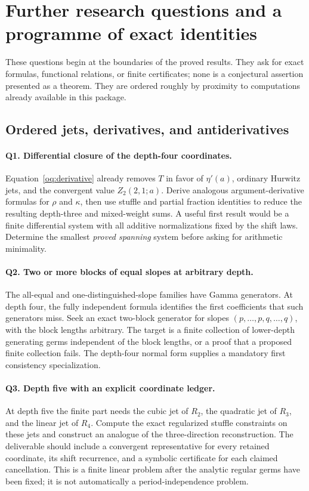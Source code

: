 \section{Further research questions and a programme of exact identities}
\label{research:section}

These questions begin at the boundaries of the proved results. They
ask for exact formulas, functional relations, or finite certificates;
none is a conjectural assertion presented as a theorem. They are ordered
roughly by proximity to computations already available in this package.

\subsection{Ordered jets, derivatives, and antiderivatives}

\paragraph{Q1. Differential closure of the depth-four coordinates.}
Equation~\eqref{oq:derivative} already removes $T$ in favor of
$\eta'(a)$, ordinary Hurwitz jets, and the convergent value
$Z_2(2,1;a)$. Derive analogous argument-derivative formulas for
$\rho$ and $\kappa$, then use stuffle and partial fraction identities
to reduce the resulting depth-three and mixed-weight sums. A useful
first result would be a finite differential system with all additive
normalizations fixed by the shift laws. Determine the smallest
\emph{proved spanning} system before asking for arithmetic minimality.

\paragraph{Q2. Two or more blocks of equal slopes at arbitrary depth.}
The all-equal and one-distinguished-slope families have Gamma
generators. At depth four, the fully independent formula identifies
the first coefficients that such generators miss. Seek an exact
two-block generator for slopes
$(p,\ldots,p,q,\ldots,q)$, with the block lengths arbitrary. The target
is a finite collection of lower-depth generating germs independent of
the block lengths, or a proof that a proposed finite collection fails.
The depth-four normal form supplies a mandatory first consistency
specialization.

\paragraph{Q3. Depth five with an explicit coordinate ledger.}
At depth five the finite part needs the cubic jet of $R_2$, the
quadratic jet of $R_3$, and the linear jet of $R_4$. Compute the exact
regularized stuffle constraints on these jets and construct an analogue
of the three-direction reconstruction. The deliverable should include
a convergent representative for every retained coordinate, its shift
recurrence, and a symbolic certificate for each claimed cancellation.
This is a finite linear problem after the analytic regular germs have
been fixed; it is not automatically a period-independence problem.

